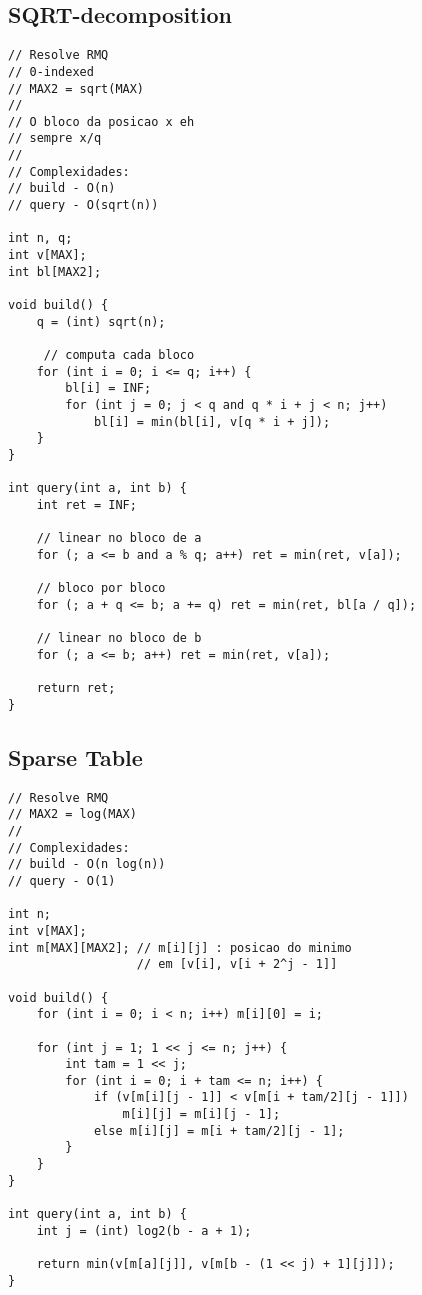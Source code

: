 \documentclass[12pt, a4paper, twoside]{article}
\begin{document}
\subsection{SQRT-decomposition}
\begin{lstlisting}
// Resolve RMQ
// 0-indexed
// MAX2 = sqrt(MAX)
//
// O bloco da posicao x eh
// sempre x/q
//
// Complexidades:
// build - O(n)
// query - O(sqrt(n))

int n, q;
int v[MAX];
int bl[MAX2];

void build() {
	q = (int) sqrt(n);
  
 	 // computa cada bloco
	for (int i = 0; i <= q; i++) {
		bl[i] = INF;
		for (int j = 0; j < q and q * i + j < n; j++)
			bl[i] = min(bl[i], v[q * i + j]);
	}
}

int query(int a, int b) {
	int ret = INF;

	// linear no bloco de a
	for (; a <= b and a % q; a++) ret = min(ret, v[a]);

	// bloco por bloco
	for (; a + q <= b; a += q) ret = min(ret, bl[a / q]);

	// linear no bloco de b
	for (; a <= b; a++) ret = min(ret, v[a]);

	return ret;
}
\end{lstlisting}

\subsection{Sparse Table}
\begin{lstlisting}
// Resolve RMQ
// MAX2 = log(MAX)
//
// Complexidades:
// build - O(n log(n))
// query - O(1)

int n;
int v[MAX];
int m[MAX][MAX2]; // m[i][j] : posicao do minimo
                  // em [v[i], v[i + 2^j - 1]]

void build() {
	for (int i = 0; i < n; i++) m[i][0] = i;

	for (int j = 1; 1 << j <= n; j++) {
		int tam = 1 << j;
		for (int i = 0; i + tam <= n; i++) {
			if (v[m[i][j - 1]] < v[m[i + tam/2][j - 1]])
				m[i][j] = m[i][j - 1];
			else m[i][j] = m[i + tam/2][j - 1];
		}
	}
}

int query(int a, int b) {
	int j = (int) log2(b - a + 1);

	return min(v[m[a][j]], v[m[b - (1 << j) + 1][j]]);
}
\end{lstlisting}
\end{document}
